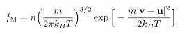 \documentclass[preview]{standalone}
\begin{document}
\begin{align*}
\special{dvisvgm:raw <g id='unique000'>}f_{\rm M}=n\Big(\frac{m}{2\pi k_BT}\Big)^{3/2}\exp\Big[-\frac{m|\va v-\va u|^2}{2k_BT}\Big]\special{dvisvgm:raw </g>}
\end{align*}
\end{document}
